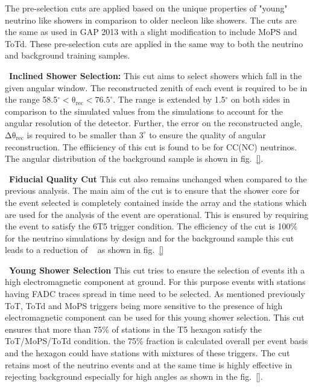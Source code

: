 The pre-selection cuts are applied based on the unique properties of "young" neutrino like showers in comparison to older necleon like showers. The cuts are the same as used in GAP 2013 with a slight modification to include MoPS and ToTd. These pre-selection cuts are applied in the same way to both the neutrino and background training samples. 
\begin{description}
  \item ~\textbf{Inclined Shower Selection:} This cut aims to select showers which fall in the given angular window. The reconstructed zenith of each event is required to be in the range 58.5$^{\circ} < \mathrm{\theta_{rec} < 76.5^{\circ}}$. The range is extended by 1.5$^\circ$ on both sides in comparison to the simulated values from the simulations to account for the angular resolution of the detector. Further, the error on the reconstructed angle, $\mathrm{\Delta \theta_{rec}}$ is required to be smaller than $3^\circ$ to ensure the quality of angular reconstruction. The effiiciency of this cut is found to be for CC(NC) neutrinos. The angular distribution of the background sample is shown in fig.~\ref{}.
  \item ~\textbf{Fiducial Quality Cut} This cut also remains unchanged when compared to the previous analysis. The main aim of the cut is to ensure that the shower core for the event selected is completely contained inside the array and the stations which are used for the analysis of the event are operational. This is ensured by requiring the event to satisfy the 6T5 trigger condition. The efficiency of the cut is 100\% for the neutrino simulations by design and for the background sample this cut leads to a reduction of ~ as shown in fig.~\ref{}   
  \item ~\textbf{Young Shower Selection} This cut tries to ensure the selection of events ith a high electromagnetic component at ground. For this purpose events with stations having FADC traces spread in time need to be selected. As mentioned previously ToT, ToTd and MoPS triggers being more sensitive to the presence of high electromagnetic component can be used for this young shower selection. This cut ensures that more than 75\% of stations in the T5 hexagon satisfy the ToT/MoPS/ToTd condition. the 75\% fraction is calculated overall per event basis and the hexagon could have stations with mixtures of these triggers. The cut retains most of the neutrino events and at the same time is highly effective in rejecting background especially for high angles as shown in the fig.~\ref{}.
\end{description} 


